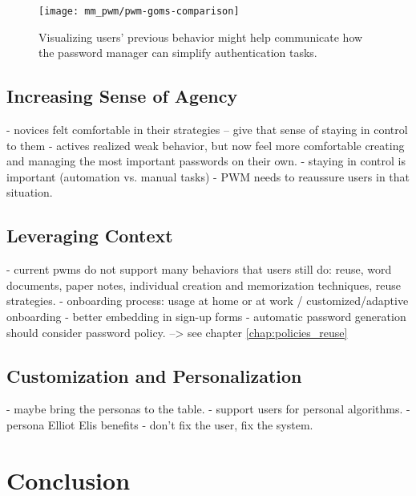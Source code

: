 \begin{figure}
	\centering
	\texttt{[image: mm\_pwm/pwm-goms-comparison]}
	\caption{\label{fig:mm_pwm:pwm-goms-comparison} Visualizing users' previous behavior might help communicate how the password manager can simplify authentication tasks.}
\end{figure}


\subsection{Increasing Sense of Agency}
- novices felt comfortable in their strategies -- give that sense of staying in control to them
- actives realized weak behavior, but now feel more comfortable creating and managing the most important passwords on their own. 
- staying in control is important (automation vs. manual tasks)
- PWM needs to reaussure users in that situation. 

\subsection{Leveraging Context}
- current pwms do not support many behaviors that users still do: reuse, word documents, paper notes, individual creation and memorization techniques, reuse strategies. 
- onboarding process: usage at home or at work / customized/adaptive onboarding
- better embedding in sign-up forms 
- automatic password generation should consider password policy. --> see chapter \ref{chap:policies_reuse}

\subsection{Customization and Personalization} - maybe bring the personas to the table. 
- support users for personal algorithms.  
- persona Elliot Elis benefits
- don't fix the user, fix the system. 



\section{Conclusion}


